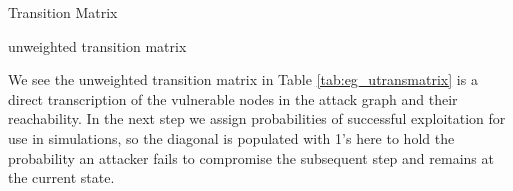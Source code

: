 \begin{table}[ht]
\caption{Transition Matrix}
\begin{subtable}[t]{0.5\textwidth}
\centering
{}
\caption{unweighted transition matrix}
\label{tab:eg_utransmatrix}
\end{subtable}
\begin{subtable}[t]{0.5\textwidth}
\centering
{}
\caption{weighted transition matrix $P$}
\label{tab:wt_transmatrix}
\end{subtable}
\label{fig:eg_tmatrix}
\end{table}


We see the unweighted transition matrix in Table \ref{tab:eg_utransmatrix} is a direct transcription of the vulnerable nodes in the attack graph and their reachability. In the next step we assign probabilities of successful exploitation for use in simulations, so the diagonal is populated with 1's here to hold the probability an attacker fails to compromise the subsequent step and remains at the current state.

